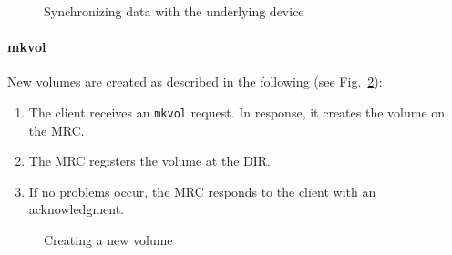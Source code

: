 \begin{figure}[h!]
\centering
{}
\caption{Synchronizing data with the underlying device}
\label{fig:interactions_fsync}
\end{figure}

\paragraph{mkvol}

New volumes are created as described in the following (see Fig.\ \ref{fig:interactions_mkvol}):

\begin{enumerate}
 \item The client receives an \texttt{mkvol} request. In response, it creates the volume on the MRC.
 \item The MRC registers the volume at the DIR.
 \item If no problems occur, the MRC responds to the client with an acknowledgment.
\end{enumerate}

\begin{figure}[h!]
\centering
{}
\caption{Creating a new volume}
\label{fig:interactions_mkvol}
\end{figure}

